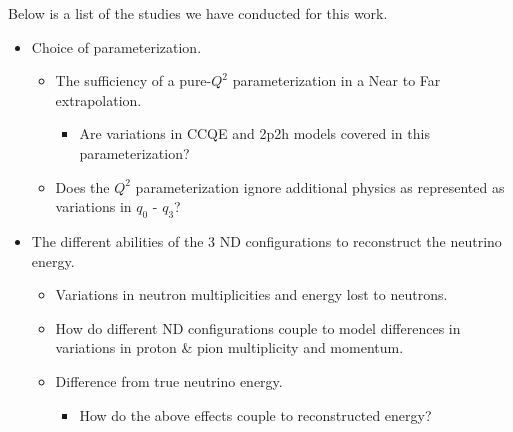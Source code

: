 \documentclass[12pt]{article}
\begin{document}
Below is a list of the studies we have conducted for this work.
\begin{itemize}
\item Choice of parameterization.
	\begin{itemize}
	\item The sufficiency of a pure-$Q^2$ parameterization in a Near to Far extrapolation.
		\begin{itemize}
			\item Are variations in CCQE and 2p2h models covered in this parameterization?
		\end{itemize} 
	\item Does the $Q^2$ parameterization ignore additional physics as represented as variations in
	 $q_0 \textrm{ - } q_3$?

	\end{itemize}
\item The different abilities of the 3 ND configurations to reconstruct the neutrino energy.
	\begin{itemize}
	\item Variations in neutron multiplicities and energy lost to neutrons.
	\item How do different ND configurations couple to model differences in variations in proton \& pion multiplicity and momentum.
	\item Difference from true neutrino energy.
	\begin{itemize}
		\item How do the above effects couple to reconstructed energy?
	\end{itemize} 
	\end{itemize}


\end{itemize}
\end{document}
